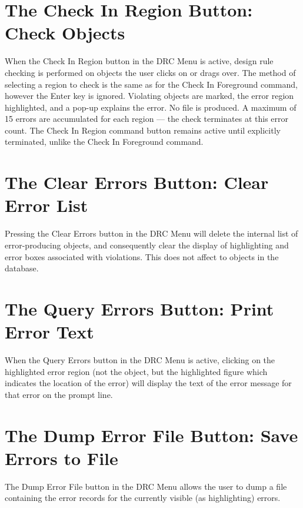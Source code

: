 \section{The {\cb Check In Region} Button: Check Objects}
When the {\cb Check In Region} button in the {\cb DRC Menu} is active,
design rule checking is performed on objects the user clicks on or
drags over.  The method of selecting a region to check is the same as
for the {\cb Check In Foreground} command, however the {\kb Enter} key
is ignored.  Violating objects are marked, the error region
highlighted, and a pop-up explains the error.  No file is produced.  A
maximum of 15 errors are accumulated for each region --- the check
terminates at this error count.  The {\cb Check In Region} command
button remains active until explicitly terminated, unlike the {\cb
Check In Foreground} command.


\section{The {\cb Clear Errors} Button: Clear Error List}
Pressing the {\cb Clear Errors} button in the {\cb DRC Menu} will
delete the internal list of error-producing objects, and consequently
clear the display of highlighting and error boxes associated with
violations.  This does not affect to objects in the database.


\section{The {\cb Query Errors} Button: Print Error Text}
When the {\cb Query Errors} button in the {\cb DRC Menu} is active,
clicking on the highlighted error region (not the object, but the
highlighted figure which indicates the location of the error) will
display the text of the error message for that error on the prompt
line.


\section{The {\cb Dump Error File} Button: Save Errors to File}
The {\cb Dump Error File} button in the {\cb DRC Menu} allows the user
to dump a file containing the error records for the currently visible
(as highlighting) errors.

